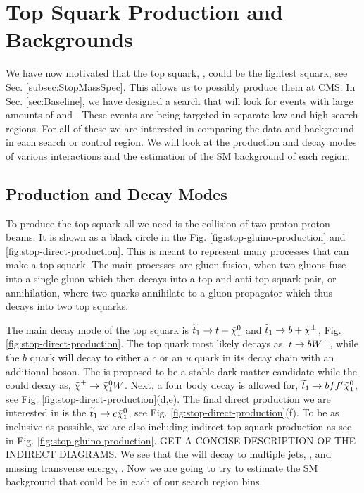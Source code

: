 \chapter{Top Squark Production and Backgrounds}
\label{ch:Search}

We have now motivated that the top squark, \st{}, could be the lightest squark, see Sec. \ref{subsec:StopMassSpec}. This allows us to possibly produce them at CMS. In Sec. \ref{sec:Baseline}, we have designed a search that will look for events with large amounts of \met{} and \nj. These events are being targeted in separate low \dm{} and high \dm{} search regions. For all of these we are interested in comparing the data and background in each search or control region. We will look at the production and decay modes of various \st{} interactions and the estimation of the SM background of each region. 

\section{Production and Decay Modes}
\label{sec:Production}

To produce the top squark all we need is the collision of two proton-proton beams. It is shown as a black circle in the Fig. \ref{fig:stop-gluino-production} and \ref{fig:stop-direct-production}. This is meant to represent many processes that can make a top squark. The main processes are gluon fusion, when two gluons fuse into a single gluon which then decays into a top and anti-top squark pair, or annihilation, where two quarks annihilate to a gluon propagator which thus decays into two top squarks. 



The main decay mode of the top squark is $\widetilde{t}_1\rightarrow t+\tilde{\chi}^{0}_{1}$ and $\widetilde{t}_1\rightarrow b+\tilde{\chi}^{\pm}$, Fig. \ref{fig:stop-direct-production}. The top quark most likely decays as, $t\rightarrow bW^+$, while the $b$ quark will decay to either a $c$ or an $u$ quark in its decay chain with an additional \W{} boson. The \neutralino{} is proposed to be a stable dark matter candidate while the \chargino{} could decay as, $\tilde{\chi}^{\pm}\rightarrow\tilde{\chi}^{0}_{1}W$. Next, a four body decay is allowed for, $\widetilde{t}_1\rightarrow b f f^\prime \tilde{\chi}^{0}_{1}$, see Fig. \ref{fig:stop-direct-production}(d,e). The final direct \st{} production we are interested in is the $\widetilde{t}_1\rightarrow c\tilde{\chi}^{0}_{1}$, see Fig. \ref{fig:stop-direct-production}(f). To be as inclusive as possible, we are also including indirect top squark production as see in Fig. \ref{fig:stop-gluino-production}. GET A CONCISE DESCRIPTION OF THE INDIRECT DIAGRAMS. We see that the \st{} will decay to multiple jets, \nj, and missing transverse energy, \met. Now we are going to try to estimate the SM background that could be in each of our search region bins.

